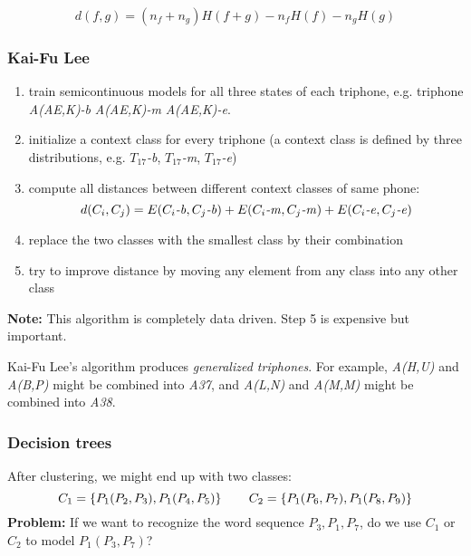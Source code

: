 \[
    d(f, g) = (n_f + n_g) H(f + g) - n_f H(f) - n_g H(g)
\]

\subsubsection{Kai-Fu Lee}
\begin{enumerate}
    \item train semicontinuous models for all three states of each triphone, e.g. triphone \textit{A(AE,K)-b} \textit{A(AE,K)-m} \textit{A(AE,K)-e}.
    \item initialize a context class for every triphone (a context class is defined by three distributions, e.g. \textit{$T_{17}$-b}, \textit{$T_{17}$-m}, \textit{$T_{17}$-e})
    \item compute all distances between different context classes of same phone:
        \[
            d(C_i, C_j) = E(C_i\mbox{\textit{-b}}, C_j\mbox{\textit{-b}}) + E(C_i\mbox{\textit{-m}}, C_j\mbox{\textit{-m}}) + E(C_i\mbox{\textit{-e}}, C_j\mbox{\textit{-e}})
        \]
    \item replace the two classes with the smallest class by their combination
    \item try to improve distance by moving any element from any class into any other class
\end{enumerate}

\vspace{10pt}
\textbf{Note:} This algorithm is completely data driven. Step 5 is expensive but important.
\vspace{10pt}

Kai-Fu Lee's algorithm produces \textit{generalized triphones}. For example, \textit{A(H,U)} and \textit{A(B,P)} might be combined into \textit{A37}, and \textit{A(L,N)} and \textit{A(M,M)} might be combined into \textit{A38}.

\subsubsection{Decision trees}

After clustering, we might end up with two classes:
\[
    C_1 = \left\{P_1(P_2, P_3), P_1(P_4, P_5) \right\} \mbox{\hspace{20pt}} C_2 = \left\{P_1(P_6, P_7), P_1(P_8, P_9) \right\}
\]
\textbf{Problem:} If we want to recognize the word sequence $P_3, P_1, P_7$, do we use $C_1$ or $C_2$ to model $P_1(P_3, P_7)$?

\vspace{5pt}


